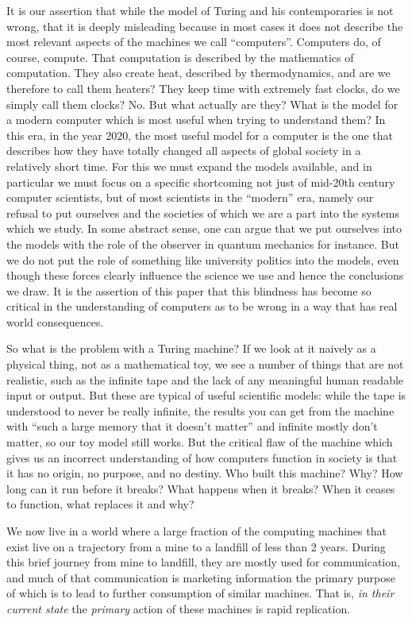 It is our assertion that while the model of Turing and his
contemporaries is not wrong, that it is deeply misleading because in
most cases it does not describe the most relevant aspects of the
machines we call ``computers''. Computers do, of course, compute. That
computation is described by the mathematics of computation. They also
create heat, described by thermodynamics, and are we therefore to call
them heaters? They keep time with extremely fast clocks, do we simply
call them clocks? No. But what actually are they? What is the model for
a modern computer which is most useful when trying to understand them?
In this era, in the year 2020, the most useful model for a computer is
the one that describes how they have totally changed all aspects of
global society in a relatively short time. For this we must expand the
models available, and in particular we must focus on a specific
shortcoming not just of mid-20th century computer scientists, but of
most scientists in the ``modern'' era, namely our refusal to put
ourselves and the societies of which we are a part into the systems
which we study. In some abstract sense, one can argue that we put
ourselves into the models with the role of the observer in quantum
mechanics for instance. But we do not put the role of something like
university politics into the models, even though these forces clearly
influence the science we use and hence the conclusions we draw. It is
the assertion of this paper that this blindness has become so critical
in the understanding of computers as to be wrong in a way that has real
world consequences.

So what is the problem with a Turing machine? If we look at it naively
as a physical thing, not as a mathematical toy, we see a number of
things that are not realistic, such as the infinite tape and the lack of
any meaningful human readable input or output. But these are typical of
useful scientific models: while the tape is understood to never be
really infinite, the results you can get from the machine with ``such a
large memory that it doesn't matter'' and infinite mostly don't matter,
so our toy model still works. But the critical flaw of the machine which
gives us an incorrect understanding of how computers function in society
is that it has no origin, no purpose, and no destiny. Who built this
machine? Why? How long can it run before it breaks? What happens when it
breaks? When it ceases to function, what replaces it and why?

We now live in a world where a large fraction of the computing machines
that exist live on a trajectory from a mine to a landfill of less than 2
years. During this brief journey from mine to landfill, they are mostly
used for communication, and much of that communication is marketing
information the primary purpose of which is to lead to further
consumption of similar machines. That is, \emph{in their current state}
the \emph{primary} action of these machines is rapid replication.

